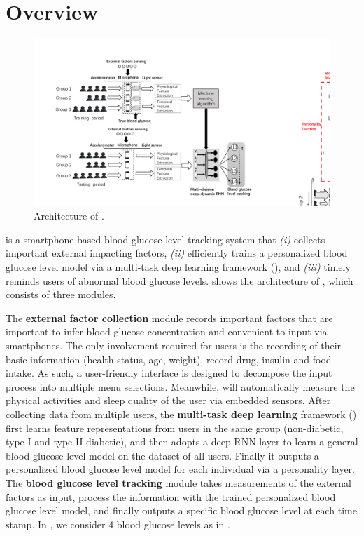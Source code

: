 
\section{Overview}
\label{sec:overview}

\begin{figure}[h]
  \centering
  \includegraphics[width=0.85\columnwidth]{./img/System_Arch.pdf}
  \caption{Architecture of \sysname. }
  \label{fig:architecture}
\end{figure}

\sysname is a smartphone-based blood glucose level tracking system that \emph{(i)} collects important external impacting factors, \emph{(ii)} efficiently trains a personalized blood glucose level model via a multi-task deep learning framework (\modelname), and \emph{(iii)} timely reminds users of abnormal blood glucose levels.
 shows the architecture of \sysname, which consists of three modules.

The \textbf{external factor collection} module records important factors that are important to infer blood glucose concentration and convenient to input via smartphones.
The only involvement required for users is the recording of their basic information (\eg health status, age, weight), record drug, insulin and food intake. As such, a user-friendly interface is designed to decompose the input process into multiple menu selections.
Meanwhile, \sysname will automatically measure the physical activities and sleep quality of the user via embedded sensors.
After collecting data from multiple users, the \textbf{multi-task deep learning} framework (\modelname) first learns feature representations from users in the same group (non-diabetic, type I and type II diabetic), and then adopts a deep RNN layer to learn a general blood glucose level model on the dataset of all users.
Finally it outputs a personalized blood glucose level model for each individual via a personality layer.
The \textbf{blood glucose level tracking} module takes measurements of the external factors as input, process the information with the trained personalized blood glucose level model, and finally outputs a specific blood glucose level at each time stamp.
In \sysname, we consider 4 blood glucose levels as in .

